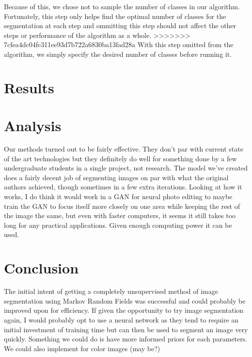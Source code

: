 \documentclass[11pt]{article}
\begin{document}
Because of this, we chose not to sample the number of classes in our algorithm.
Fortunately, this step only helps find the optimal number of classes for the segmentation at each step and ommitting this step should not affect the other steps or performance of the algorithm as a whole.
>>>>>>> 7cfea4dc04fc311ee93d7b722a6830ba13fad28a
With this step omitted from the algorithm, we simply specify the desired number of classes before running it.

\section{Results}


\section{Analysis}
Our methods turned out to be fairly effective. They don’t par with current state of the art technologies but they definitely do well for something done by a few undergraduate students in a single project, not research. The model we’ve created does a fairly decent job of segmenting images on par with what the original authors achieved, though sometimes in a few extra iterations. Looking at how it works, I do think it would work in a GAN for neural photo editing to maybe train the GAN to focus itself more closely on one area while keeping the rest of the image the same, but even with faster computers, it seems it still takes too long for any practical applications. Given enough computing power it can be used.

\section{Conclusion}
The initial intent of getting a completely unsupervised method of image segmentation using Markov Random Fields was successful and could probably be improved upon for efficiency. If given the opportunity to try image segmentation again, I would probably opt to use a neural network as they tend to require an initial investment of training time but can then be used to segment an image very quickly. Something we could do is have more informed priors for each parameters. We could also implement for color images (may be?)
\end{document}
